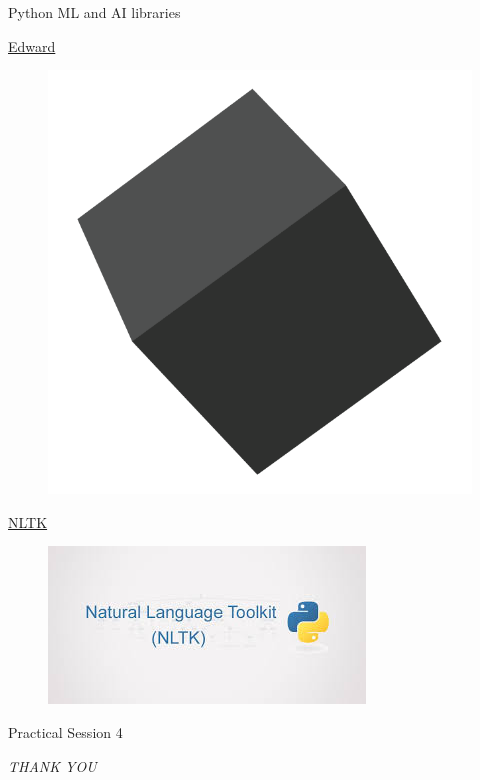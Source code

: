 \documentclass{bredelebeamer}
\begin{document}
\begin{frame}{Python ML and AI libraries}
\begin{multicols}{3}
\begin{figure}[h]
\end{figure}
\href{http://edwardlib.org/}{Edward}
\begin{figure}[h]
\includegraphics[scale=0.15]{../image/edward.png}
\end{figure}
\href{http://www.nltk.org/}{NLTK}
\begin{figure}[h]
\includegraphics[scale=0.2]{../image/nltk.jpg}
\end{figure}
\end{multicols}
\end{frame}

\begin{frame}{}
\centering
{\LARGE  Practical Session 4}
\end{frame}
\begin{frame}
\centering
\emph{THANK YOU}
\end{frame}
\end{document}
